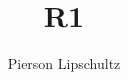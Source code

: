 \documentclass{article}
\title{R1}
\author{Pierson Lipschultz}
\theoremstyle{mytheoremstyle}
\theoremstyle{mytheoremstyle}
\theoremstyle{myproblemstyle}
\theoremstyle{myproblemstyle}
\begin{document}
    \pagestyle{fancy}

    \fancyhf{}
    \fancyfoot[L]{\nouppercase{\leftmark}} %
    \fancyfoot[R]{\thepage}%

    \renewcommand{\headrulewidth}{0pt}
    \renewcommand{\footrulewidth}{0.4pt}
    \renewcommand{\sectionmark}[1]{\markboth{#1}{}}

    \maketitle
\end{document}
